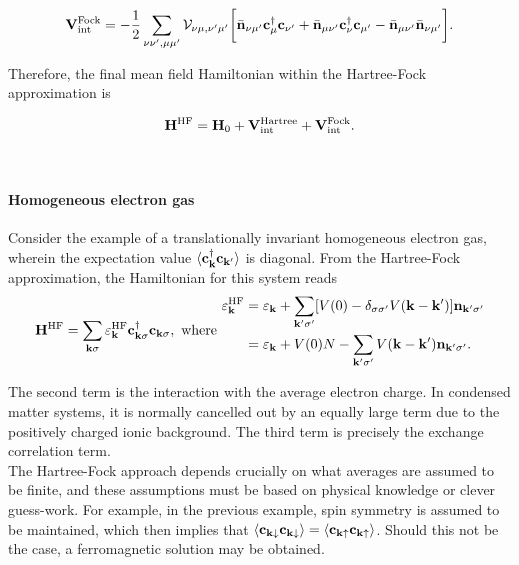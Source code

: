 \begin{equation}
    {\bf V}_{\textnormal{int}}^{\textnormal{Fock}} = - \frac{1}{2} \sum_{\nu\nu', \mu\mu'} {\mathcal V}_{\nu\mu, \nu'\mu'} \bigg[ \bar{\bf n}_{\nu \mu'} {\bf c}_{\mu}^\dagger {\bf c}_{\nu'} + \bar{\bf n}_{\mu \nu'} {\bf c}_{\nu}^\dagger {\bf c}_{\mu'} - \bar{\bf n}_{\mu \nu'} \bar{\bf n}_{\nu \mu'}\bigg].
\end{equation}

Therefore, the final mean field Hamiltonian within the Hartree-Fock approximation is 

\begin{equation}
    {\bf H}^{\textnormal{HF}} = {\bf H}_0 + {\bf V}_{\textnormal{int}}^{\textnormal{Hartree}} + {\bf V}_{\textnormal{int}}^{\textnormal{Fock}}.
\end{equation}

\blanky \\

\paragraph{\textbf{Homogeneous electron gas}}

Consider the example of a translationally invariant homogeneous electron gas, wherein the expectation value $\langle {\bf c}_{\bf k}^\dagger {\bf c}_{\bf k'} \rangle$ is diagonal. From the Hartree-Fock approximation, the Hamiltonian for this system reads 
\begin{align}
    {\bf H}^{\textnormal{HF}} = \sum_{{\bf k} \sigma} \varepsilon_{\bf k}^{\textnormal{HF}} {\bf c}_{{\bf k} \sigma}^\dagger {\bf c}_{{\bf k} \sigma}, \textnormal{ where } \begin{split}
        \varepsilon_{\bf k}^{\textnormal{HF}} &= \varepsilon_{\bf k} + \sum_{{\bf k}' \sigma'} [V(0) - \delta_{\sigma\sigma'} V({\bf k}- {\bf k}')] {\bf n}_{{\bf k}' \sigma'} \\
        &= \varepsilon_{\bf k} + V(0) N - \sum_{{\bf k}' \sigma'} V({\bf k}- {\bf k}') {\bf n}_{{\bf k'} \sigma'}.
    \end{split}
\end{align}

The second term is the interaction with the average electron charge. In condensed matter systems, it is normally cancelled out by an equally large term due to the positively charged ionic background. The third term is precisely the exchange correlation term. \\

The Hartree-Fock approach depends crucially on what averages are assumed to be finite, and these assumptions must be based on physical knowledge or clever guess-work. For example, in the previous example, spin symmetry is assumed to be maintained, which then implies that $\langle {\bf c}_{{\bf k} \downarrow} {\bf c}_{{\bf k}\downarrow} \rangle = \langle {\bf c}_{{\bf k} \uparrow} {\bf c}_{{\bf k}\uparrow} \rangle$. Should this not be the case, a ferromagnetic solution may be obtained. \\

